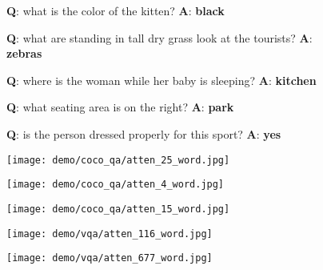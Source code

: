 \documentclass{article}
\begin{document}
\begin{figure}[p]
\begin{minipage}{0.19\linewidth}
\begin{center}
\tiny{\textbf{Q}: what is the color of the kitten? \textbf{A}: \textbf{black}}
\end{center}
\end{minipage}
\begin{minipage}{0.19\linewidth}
\begin{center}
\tiny{\textbf{Q}: what are standing in tall dry grass look at the tourists? \textbf{A}: \textbf{zebras}}
\end{center}
\end{minipage}
\begin{minipage}{0.19\linewidth}
\begin{center}
\tiny{\textbf{Q}: where is the woman while her baby is sleeping? \textbf{A}: \textbf{kitchen}}
\end{center}
\end{minipage}
\begin{minipage}{0.19\linewidth}
\begin{center}
\tiny{\textbf{Q}:  what seating area is on the right? \textbf{A}: \textbf{park}}
\end{center}
\end{minipage}
\begin{minipage}{0.19\linewidth}
\begin{center}
\tiny{\textbf{Q}: is the person dressed properly for this sport? \textbf{A}: \textbf{yes}}
\end{center}   
\end{minipage}

\begin{minipage}{0.19\linewidth}
\texttt{[image: demo/coco\_qa/atten\_25\_word.jpg]}
\end{minipage}
\begin{minipage}{0.19\linewidth}
\texttt{[image: demo/coco\_qa/atten\_4\_word.jpg]}
\end{minipage}
\begin{minipage}{0.19\linewidth}
\texttt{[image: demo/coco\_qa/atten\_15\_word.jpg]}
\end{minipage}
\begin{minipage}{0.19\linewidth}
\texttt{[image: demo/vqa/atten\_116\_word.jpg]}
\end{minipage}
\begin{minipage}{0.19\linewidth}
\texttt{[image: demo/vqa/atten\_677\_word.jpg]}
\end{minipage}


\end{figure}
\end{document}
